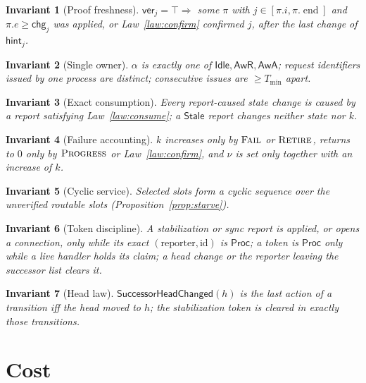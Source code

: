 \documentclass[journal]{IEEEtran}
\newtheorem{invariant}{Invariant}
\newcommand{\pend}{\operatorname{end}}
\newcommand{\hint}{\mathsf{hint}}
\newcommand{\ver}{\mathsf{ver}}
\newcommand{\chg}{\mathsf{chg}}
\newcommand{\Idle}{\mathsf{Idle}}
\newcommand{\AwR}{\mathsf{AwR}}
\newcommand{\AwA}{\mathsf{AwA}}
\newcommand{\Proc}{\mathsf{Proc}}
\newcommand{\Stale}{\mathsf{Stale}}
\newcommand{\Fail}{\textsc{Fail}}
\newcommand{\Retire}{\textsc{Retire}}
\newcommand{\Progress}{\textsc{Progress}}
\newcommand{\att}{\alpha}
\begin{document}
\begin{invariant}[Proof freshness]\label{inv:fresh}
$\ver_j=\top\Rightarrow$ some $\pi$ with $j\in[\pi.i,\pi.\pend]$ and
$\pi.e\ge\chg_j$ was applied, or Law~\ref{law:confirm} confirmed $j$, after
the last change of $\hint_j$.
\end{invariant}

\begin{invariant}[Single owner]\label{inv:owner}
$\att$ is exactly one of $\Idle,\AwR,\AwA$; request identifiers issued
by one process are distinct; consecutive issues are $\ge T_{\min}$ apart.
\end{invariant}

\begin{invariant}[Exact consumption]\label{inv:consume}
Every report-caused state change is caused by a report satisfying
Law~\ref{law:consume}; a $\Stale$ report changes neither state nor $k$.
\end{invariant}

\begin{invariant}[Failure accounting]\label{inv:failure}
$k$ increases only by $\Fail$ or $\Retire$, returns to $0$ only by
$\Progress$ or Law~\ref{law:confirm}, and $\nu$ is set only together with
an increase of $k$.
\end{invariant}

\begin{invariant}[Cyclic service]\label{inv:cyclic}
Selected slots form a cyclic sequence over the unverified routable slots
(Proposition~\ref{prop:starve}).
\end{invariant}

\begin{invariant}[Token discipline]\label{inv:token}
A stabilization or sync report is applied, or opens a connection, only
while its exact $(\text{reporter},\mathrm{id})$ is $\Proc$; a token is
$\Proc$ only while a live handler holds its claim; a head change or the
reporter leaving the successor list clears it.
\end{invariant}

\begin{invariant}[Head law]\label{inv:head}
$\mathsf{SuccessorHeadChanged}(h)$ is the last action of a transition iff the
head moved to $h$; the stabilization token is cleared in exactly those
transitions.
\end{invariant}

\section{Cost}\label{sec:cost}
\end{document}
